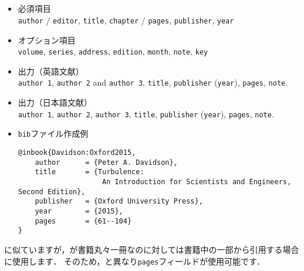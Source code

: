 \documentclass[a4paper,fleqn,uplatex,dvipdfmx]{jsarticle}
\begin{document}
\subsection{\ttinbook}
\label{ssec:inbook}
\begin{screen}
    \begin{itemize}
        \item 必須項目 \\
        \verb|author| / \verb|editor|, \verb|title|, \verb|chapter| / \verb|pages|, \verb|publisher|, \verb|year|
        \item オプション項目 \\
        \verb|volume|, \verb|series|, \verb|address|, \verb|edition|, \verb|month|, \verb|note|, \verb|key|
        \item 出力（英語文献） \\
            \colorbox[gray]{0.8}{\texttt{author 1}}, \colorbox[gray]{0.8}{\texttt{author 2}} and \colorbox[gray]{0.8}{\texttt{author 3}}, \colorbox[gray]{0.8}{\texttt{title}}, \colorbox[gray]{0.8}{\texttt{publisher}} (\colorbox[gray]{0.8}{\texttt{year}}), \colorbox[gray]{0.8}{\texttt{pages}}, \colorbox[gray]{0.8}{\texttt{note}}.
        \item 出力（日本語文献） \\
            \colorbox[gray]{0.8}{\texttt{author 1}}, \colorbox[gray]{0.8}{\texttt{author 2}}, \colorbox[gray]{0.8}{\texttt{author 3}}, \colorbox[gray]{0.8}{\texttt{title}}, \colorbox[gray]{0.8}{\texttt{publisher}} (\colorbox[gray]{0.8}{\texttt{year}}), \colorbox[gray]{0.8}{\texttt{pages}}, \colorbox[gray]{0.8}{\texttt{note}}.
        \item \verb|bib|ファイル作成例 \vspace{-3mm}
\begin{verbatim}
@inbook{Davidson:Oxford2015,
    author      = {Peter A. Davidson},
    title       = {Turbulence: 
                    An Introduction for Scientists and Engineers, Second Edition},
    publisher   = {Oxford University Press},
    year        = {2015},
    pages       = {61--104}
}
\end{verbatim}
    \end{itemize}
\end{screen}

\ttbook に似ていますが，\ttbook が書籍丸々一冊なのに対して\ttinbook は書籍中の一部から引用する場合に使用します．
そのため，\ttbook と異なり\verb|pages|フィールドが使用可能です．
\end{document}
